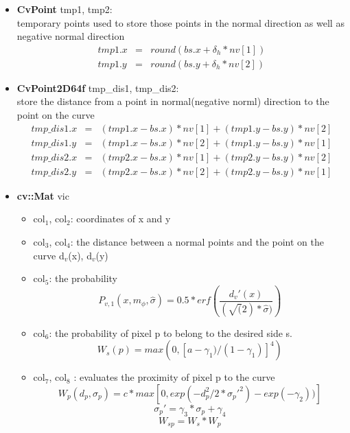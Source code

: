 \documentclass[11pt]{article}
\begin{document}
\begin{itemize}
\item \textbf{CvPoint} tmp1, tmp2:\\
\label{sec-1_1_2_13}%
temporary points used to store those points in the
 normal direction as well as negative normal direction
\begin{eqnarray}
\label{eq:1}
tmp1.x  & = & round(bs.x + \delta_{h}*nv[1])\\
tmp1.y  & = & round(bs.y + \delta_{h}*nv[2])
\end{eqnarray}


\item \textbf{CvPoint2D64f} tmp\_dis1, tmp\_dis2:\\
\label{sec-1_1_2_14}%
store the distance from a point in normal(negative norml) direction
to the point on the curve
\begin{eqnarray}
\label{eq:2}
tmp\_dis1.x & =  &  (tmp1.x - bs.x)*nv[1] + (tmp1.y - bs.y)*nv[2] \\
tmp\_dis1.y & =  &  (tmp1.x - bs.x)*nv[2] + (tmp1.y - bs.y)*nv[1] \\
tmp\_dis2.x & =  &  (tmp2.x - bs.x)*nv[1] + (tmp2.y - bs.y)*nv[2] \\
tmp\_dis2.y & =  &  (tmp2.x - bs.x)*nv[2] + (tmp2.y - bs.y)*nv[1]
\end{eqnarray}


\item \textbf{cv::Mat} vic
\label{sec-1_1_2_15}%
\begin{itemize}

\item col$_1$, col$_2$: coordinates of x and y\\
\label{sec-1_1_2_15_1}%
\item col$_3$, col$_4$: the distance between a normal points and the point on the curve d$_v$(x), d$_v$(y)\\
\label{sec-1_1_2_15_2}%
\item col$_5$: the probability
\label{sec-1_1_2_15_3}%
\begin{displaymath}
P_{v,1}(x, m_\phi, \hat{\sigma}) = 0.5*erf(\frac{d_{v}'(x)}{(\sqrt(2)*\hat{\sigma})})
\end{displaymath}

\item col$_6$: the probability of pixel p to belong to the desired side s.
\label{sec-1_1_2_15_4}%
\begin{displaymath}
       W_s(p) = max(0, [a-\gamma_{1})/(1-\gamma_{1})]^4)
\end{displaymath}

\item col$_7$, col$_8$ : evaluates the proximity of pixel p to the curve
\label{sec-1_1_2_15_5}%
\begin{displaymath}
       W_p(d_p, \sigma_p) = c*max[0, exp(-d_p^2/2*\sigma_p'^2) - exp(-\gamma_2))]
\end{displaymath}
\begin{displaymath}
       \sigma_p' = \gamma_3*\sigma_p + \gamma_4
\end{displaymath}
\begin{displaymath}
       W_{sp} = W_s * W_p
\end{displaymath}


\end{itemize}
\end{itemize}
\end{document}
